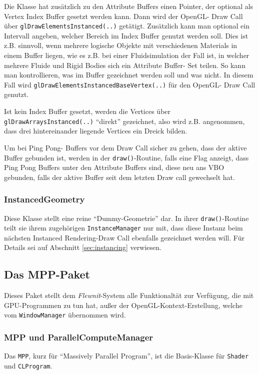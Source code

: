 	Die Klasse hat zusätzlich zu den Attribute Buffers einen Pointer, der optional als Vertex Index Buffer
	gesetzt werden kann. Dann wird der OpenGL- Draw Call über \lstinline|glDrawElementsInstanced(..)|
	getätigt.
	Zusätzlich kann man optional ein Intervall angeben, welcher Bereich 
	im Index Buffer genutzt werden soll.
	Dies ist z.B. sinnvoll, wenn mehrere logische Objekte mit verschiedenen Materials in einem Buffer
	liegen, wie es z.B. bei einer Fluidsimulation der Fall ist, in welcher mehrere Fluide und Rigid Bodies sich
	ein Attribute Buffer- Set teilen. So kann man kontrollieren, was im Buffer gezeichnet werden soll und was nicht.
	In diesem Fall wird \lstinline|glDrawElementsInstancedBaseVertex(..)| für den OpenGL- Draw Call genutzt.
	
	Ist kein Index Buffer gesetzt, werden die Vertices über \lstinline|glDrawArraysInstanced(..)|	
	 "`direkt"' gezeichnet, also wird z.B. angenommen, dass drei hintereinander liegende Vertices ein Dreick bilden. 
	
	Um bei Ping Pong- Buffers vor dem Draw Call sicher zu gehen, dass der aktive Buffer gebunden ist,
	werden in der \lstinline|draw()|-Routine, falls eine Flag anzeigt, dass Ping Pong Buffers unter den 
	Attribute Buffers sind, diese neu ans VBO gebunden, falls der aktive Buffer seit dem letzten Draw call gewechselt hat.
	
	
	\subsubsection{InstancedGeometry}
	\label{architecture:InstancedGeometry}
	Diese Klasse stellt eine reine "`Dummy-Geometrie"' dar. In ihrer \lstinline|draw()|-Routine teilt sie ihrem
	zugehörigen \lstinline|InstanceManager| nur mit, dass diese Instanz beim nächsten Instanced Rendering-Draw Call
	ebenfalls gezeichnet werden will. Für Details sei auf Abschnitt \ref{sec:instancing} verwiesen.
	
	

\subsection{Das MPP-Paket}

Dieses Paket stellt dem \emph{Flewnit}-System alle Funktionaltät zur Verfügung, die mit
GPU-Programmen zu tun hat, außer der OpenGL-Kontext-Erstellung,
welche vom \lstinline|WindowManager| übernommen wird.


	\subsubsection{MPP und ParallelComputeManager}
	Das \lstinline|MPP|, kurz für "`Massively Parallel Program"', ist die Basis-Klasse für
	\lstinline|Shader| und \lstinline|CLProgram|.
	
